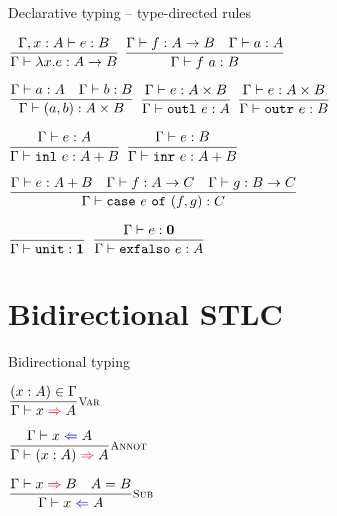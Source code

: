 \documentclass{beamer}
\newcommand{\Fun}[2]{#1 \to #2}
\newcommand{\Prod}[2]{#1 \times #2}
\newcommand{\Sum}[2]{#1 + #2}
\newcommand{\Unit}{\textbf{1}}
\newcommand{\Empty}{\textbf{0}}
\newcommand{\annot}[2]{(#1 : #2)}
\newcommand{\fun}[2]{\lambda #1. #2}
\newcommand{\app}[2]{#1\ #2}
\newcommand{\pair}[2]{(#1, #2)}
\newcommand{\outl}[1][]{\texttt{outl}\ #1}
\newcommand{\outr}[1][]{\texttt{outr}\ #1}
\newcommand{\inl}[1][]{\texttt{inl}\ #1}
\newcommand{\inr}[1][]{\texttt{inr}\ #1}
\newcommand{\case}[3]{\texttt{case}\ #1\ \texttt{of}\ (#2, #3)}
\newcommand{\unit}{\texttt{unit}}
\newcommand{\elimEmpty}[1][]{\texttt{exfalso}\ #1}
\newcommand{\fulltyping}[3]{#1 \vdash #2 : #3}
\newcommand{\typing}[2]{\fulltyping{\Gamma}{#1}{#2}}
\newcommand{\infrule}[3][]{\displaystyle \frac{#2}{#3} \textsc{\footnotesize{#1}}}
\newcommand{\extend}[3]{#1, #2 : #3}
\newcommand{\sidecond}[1]{#1}
\begin{document}
\begin{frame}{Declarative typing -- type-directed rules}

\begin{center}
  $\infrule{\fulltyping{\extend{\Gamma}{x}{A}}{e}{B}}{\typing{\fun{x}{e}}{\Fun{A}{B}}}$ \quad
  $\infrule{\typing{f}{\Fun{A}{B}} \quad \typing{a}{A}}{\typing{\app{f}{a}}{B}}$

  \vspace{2em}

  $\infrule{\typing{a}{A} \quad \typing{b}{B}}{\typing{\pair{a}{b}}{\Prod{A}{B}}}$ \quad
  $\infrule{\typing{e}{\Prod{A}{B}}}{\typing{\outl[e]}{A}}$ \quad
  $\infrule{\typing{e}{\Prod{A}{B}}}{\typing{\outr[e]}{B}}$

  \vspace{2em}

  $\infrule{\typing{e}{A}}{\typing{\inl[e]}{\Sum{A}{B}}}$ \quad
  $\infrule{\typing{e}{B}}{\typing{\inr[e]}{\Sum{A}{B}}}$

  \vspace{2em}

  $\infrule{\typing{e}{\Sum{A}{B}} \quad \typing{f}{\Fun{A}{C}} \quad \typing{g}{\Fun{B}{C}}}{\typing{\case{e}{f}{g}}{C}}$

  \vspace{2em}

  $\infrule{}{\typing{\unit}{\Unit}}$ \quad
  $\infrule{\typing{e}{\Empty}}{\typing{\elimEmpty[e]}{A}}$
\end{center}

\end{frame}

\section{Bidirectional STLC}

\newcommand{\fullcheck}[3]{#1 \vdash #2 \mathcolor{blue}{\Leftarrow} #3}
\renewcommand{\check}[2]{\fullcheck{\Gamma}{#1}{#2}}

\newcommand{\fullinfer}[3]{#1 \vdash #2 \mathcolor{red}{\Rightarrow} #3}
\newcommand{\infer}[2]{\fullinfer{\Gamma}{#1}{#2}}

\begin{frame}{Bidirectional typing}

\begin{center}
  $\infrule[Var]{\sidecond{(x : A) \in \Gamma}}{\infer{x}{A}}$

  \vspace{2em}

  $\infrule[Annot]{\check{x}{A}}{\infer{\annot{x}{A}}{A}}$

  \vspace{2em}

  $\infrule[Sub]{\infer{x}{B} \quad \sidecond{A = B}}{\check{x}{A}}$
\end{center}

\end{frame}
\end{document}
